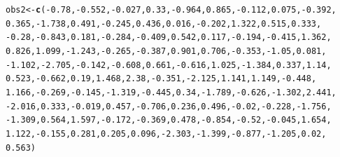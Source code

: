 \documentclass{report}\usepackage[]{graphicx}\usepackage[]{color}
\makeatletter
\newcommand{\hlnum}[1]{\textcolor[rgb]{0.686,0.059,0.569}{#1}}%
\newcommand{\hlopt}[1]{\textcolor[rgb]{0,0,0}{#1}}%
\newcommand{\hlstd}[1]{\textcolor[rgb]{0.345,0.345,0.345}{#1}}%
\newcommand{\hlkwb}[1]{\textcolor[rgb]{0.69,0.353,0.396}{#1}}%
\newcommand{\hlkwd}[1]{\textcolor[rgb]{0.737,0.353,0.396}{\textbf{#1}}}%
\newenvironment{kframe}{%
 \def\at@end@of@kframe{}%
 \ifinner\ifhmode%
  \def\at@end@of@kframe{\end{minipage}}%
  \begin{minipage}{\columnwidth}%
 \fi\fi%
 \def\FrameCommand##1{\hskip\@totalleftmargin \hskip-\fboxsep
 \colorbox{shadecolor}{##1}\hskip-\fboxsep
     \hskip-\linewidth \hskip-\@totalleftmargin \hskip\columnwidth}%
 \MakeFramed {\advance\hsize-\width
   \@totalleftmargin\z@ \linewidth\hsize
   \@setminipage}}%
 {\par\unskip\endMakeFramed%
 \at@end@of@kframe}
\newenvironment{knitrout}{}{} %
\makeatother
\begin{document}
\begin{knitrout}
\begin{kframe}
\begin{alltt}
\hlstd{obs2} \hlkwb{<-} \hlkwd{c}\hlstd{(}\hlopt{-}\hlnum{0.78}\hlstd{,} \hlopt{-}\hlnum{0.552}\hlstd{,} \hlopt{-}\hlnum{0.027}\hlstd{,} \hlnum{0.33}\hlstd{,} \hlopt{-}\hlnum{0.964}\hlstd{,} \hlnum{0.865}\hlstd{,} \hlopt{-}\hlnum{0.112}\hlstd{,} \hlnum{0.075}\hlstd{,} \hlopt{-}\hlnum{0.392}\hlstd{,}
    \hlnum{0.365}\hlstd{,} \hlopt{-}\hlnum{1.738}\hlstd{,} \hlnum{0.491}\hlstd{,} \hlopt{-}\hlnum{0.245}\hlstd{,} \hlnum{0.436}\hlstd{,} \hlnum{0.016}\hlstd{,} \hlopt{-}\hlnum{0.202}\hlstd{,} \hlnum{1.322}\hlstd{,} \hlnum{0.515}\hlstd{,} \hlnum{0.333}\hlstd{,}
    \hlopt{-}\hlnum{0.28}\hlstd{,} \hlopt{-}\hlnum{0.843}\hlstd{,} \hlnum{0.181}\hlstd{,} \hlopt{-}\hlnum{0.284}\hlstd{,} \hlopt{-}\hlnum{0.409}\hlstd{,} \hlnum{0.542}\hlstd{,} \hlnum{0.117}\hlstd{,} \hlopt{-}\hlnum{0.194}\hlstd{,} \hlopt{-}\hlnum{0.415}\hlstd{,} \hlnum{1.362}\hlstd{,}
    \hlnum{0.826}\hlstd{,} \hlnum{1.099}\hlstd{,} \hlopt{-}\hlnum{1.243}\hlstd{,} \hlopt{-}\hlnum{0.265}\hlstd{,} \hlopt{-}\hlnum{0.387}\hlstd{,} \hlnum{0.901}\hlstd{,} \hlnum{0.706}\hlstd{,} \hlopt{-}\hlnum{0.353}\hlstd{,} \hlopt{-}\hlnum{1.05}\hlstd{,} \hlnum{0.081}\hlstd{,}
    \hlopt{-}\hlnum{1.102}\hlstd{,} \hlopt{-}\hlnum{2.705}\hlstd{,} \hlopt{-}\hlnum{0.142}\hlstd{,} \hlopt{-}\hlnum{0.608}\hlstd{,} \hlnum{0.661}\hlstd{,} \hlopt{-}\hlnum{0.616}\hlstd{,} \hlnum{1.025}\hlstd{,} \hlopt{-}\hlnum{1.384}\hlstd{,} \hlnum{0.337}\hlstd{,} \hlnum{1.14}\hlstd{,}
    \hlnum{0.523}\hlstd{,} \hlopt{-}\hlnum{0.662}\hlstd{,} \hlnum{0.19}\hlstd{,} \hlnum{1.468}\hlstd{,} \hlnum{2.38}\hlstd{,} \hlopt{-}\hlnum{0.351}\hlstd{,} \hlopt{-}\hlnum{2.125}\hlstd{,} \hlnum{1.141}\hlstd{,} \hlnum{1.149}\hlstd{,} \hlopt{-}\hlnum{0.448}\hlstd{,}
    \hlnum{1.166}\hlstd{,} \hlopt{-}\hlnum{0.269}\hlstd{,} \hlopt{-}\hlnum{0.145}\hlstd{,} \hlopt{-}\hlnum{1.319}\hlstd{,} \hlopt{-}\hlnum{0.445}\hlstd{,} \hlnum{0.34}\hlstd{,} \hlopt{-}\hlnum{1.789}\hlstd{,} \hlopt{-}\hlnum{0.626}\hlstd{,} \hlopt{-}\hlnum{1.302}\hlstd{,} \hlnum{2.441}\hlstd{,}
    \hlopt{-}\hlnum{2.016}\hlstd{,} \hlnum{0.333}\hlstd{,} \hlopt{-}\hlnum{0.019}\hlstd{,} \hlnum{0.457}\hlstd{,} \hlopt{-}\hlnum{0.706}\hlstd{,} \hlnum{0.236}\hlstd{,} \hlnum{0.496}\hlstd{,} \hlopt{-}\hlnum{0.02}\hlstd{,} \hlopt{-}\hlnum{0.228}\hlstd{,} \hlopt{-}\hlnum{1.756}\hlstd{,}
    \hlopt{-}\hlnum{1.309}\hlstd{,} \hlnum{0.564}\hlstd{,} \hlnum{1.597}\hlstd{,} \hlopt{-}\hlnum{0.172}\hlstd{,} \hlopt{-}\hlnum{0.369}\hlstd{,} \hlnum{0.478}\hlstd{,} \hlopt{-}\hlnum{0.854}\hlstd{,} \hlopt{-}\hlnum{0.52}\hlstd{,} \hlopt{-}\hlnum{0.045}\hlstd{,} \hlnum{1.654}\hlstd{,}
    \hlnum{1.122}\hlstd{,} \hlopt{-}\hlnum{0.155}\hlstd{,} \hlnum{0.281}\hlstd{,} \hlnum{0.205}\hlstd{,} \hlnum{0.096}\hlstd{,} \hlopt{-}\hlnum{2.303}\hlstd{,} \hlopt{-}\hlnum{1.399}\hlstd{,} \hlopt{-}\hlnum{0.877}\hlstd{,} \hlopt{-}\hlnum{1.205}\hlstd{,} \hlnum{0.02}\hlstd{,}
    \hlnum{0.563}\hlstd{)}


\end{alltt}
\end{kframe}
\end{knitrout}
\end{document}
